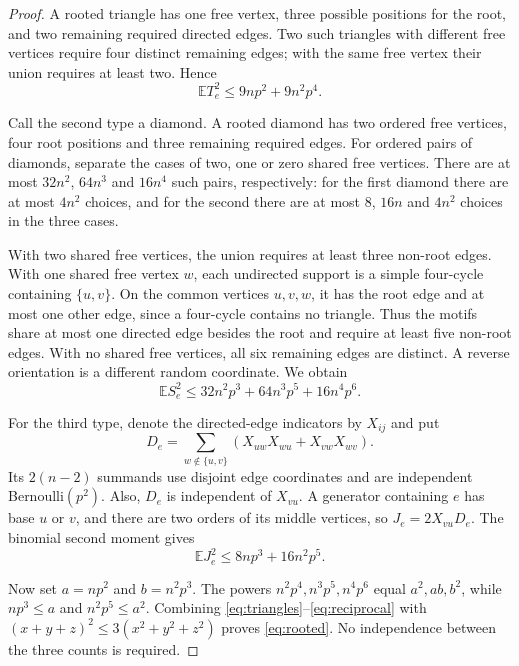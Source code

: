 \documentclass[11pt]{article}
\newcommand{\E}{\mathbb E}
\begin{document}
\begin{proof}
A rooted triangle has one free vertex, three possible positions for the root, and two remaining required directed edges. Two such triangles with different free vertices require four distinct remaining edges; with the same free vertex their union requires at least two. Hence
\begin{equation}\label{eq:triangles}
 \E T_e^2\le9np^2+9n^2p^4.
\end{equation}

Call the second type a diamond. A rooted diamond has two ordered free vertices, four root positions and three remaining required edges. For ordered pairs of diamonds, separate the cases of two, one or zero shared free vertices. There are at most $32n^2$, $64n^3$ and $16n^4$ such pairs, respectively: for the first diamond there are at most $4n^2$ choices, and for the second there are at most $8$, $16n$ and $4n^2$ choices in the three cases.

With two shared free vertices, the union requires at least three non-root edges. With one shared free vertex $w$, each undirected support is a simple four-cycle containing $\{u,v\}$. On the common vertices $u,v,w$, it has the root edge and at most one other edge, since a four-cycle contains no triangle. Thus the motifs share at most one directed edge besides the root and require at least five non-root edges. With no shared free vertices, all six remaining edges are distinct. A reverse orientation is a different random coordinate. We obtain
\begin{equation}\label{eq:diamonds}
 \E S_e^2\le32n^2p^3+64n^3p^5+16n^4p^6.
\end{equation}

For the third type, denote the directed-edge indicators by $X_{ij}$ and put
\[
 D_e=\sum_{w\notin\{u,v\}}
       (X_{uw}X_{wu}+X_{vw}X_{wv}).
\]
Its $2(n-2)$ summands use disjoint edge coordinates and are independent Bernoulli$(p^2)$. Also, $D_e$ is independent of $X_{vu}$. A generator containing $e$ has base $u$ or $v$, and there are two orders of its middle vertices, so $J_e=2X_{vu}D_e$. The binomial second moment gives
\begin{equation}\label{eq:reciprocal}
 \E J_e^2\le8np^3+16n^2p^5.
\end{equation}

Now set $a=np^2$ and $b=n^2p^3$. The powers $n^2p^4,n^3p^5,n^4p^6$ equal $a^2,ab,b^2$, while $np^3\le a$ and $n^2p^5\le a^2$. Combining \eqref{eq:triangles}--\eqref{eq:reciprocal} with $(x+y+z)^2\le3(x^2+y^2+z^2)$ proves \eqref{eq:rooted}. No independence between the three counts is required.
\end{proof}
\end{document}

